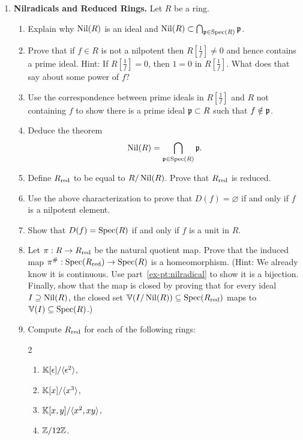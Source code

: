 \documentclass[12pt,reqno]{amsart}
\begin{document}
\begin{enumerate}[leftmargin=*, resume=problems]

\item \textbf{Nilradicals and Reduced Rings.} Let $R$ be a ring. 
\begin{enumerate}
	\item Explain why $\operatorname{Nil}(R)$ is an ideal and $\operatorname{Nil}(R)\subset \bigcap_{\mathfrak{p}\in \operatorname{Spec}(R)}\mathfrak{p}$.
	\item Prove that if $f \in R$ is not a nilpotent then $R[\frac{1}{f}] \neq 0$ and hence contains a prime ideal. Hint: If $R[\frac{1}{f}]=0$, then $1=0$ in $R[\frac{1}{f}]$. What does that say about some power of $f$?
	\item Use the correspondence between prime ideals in $R[\frac{1}{f}]$ and $R$ not containing $f$ to show there is a prime ideal $\mathfrak{p}\subset R$ such that $f\notin \mathfrak{p}$.
	\item\label{ex-pt:nilradical} Deduce the theorem
	\[
	\operatorname{Nil}(R)=\bigcap_{\mathfrak{p}\in \operatorname{Spec}(R)}\mathfrak{p}. 
	\]
	\item Define $R_{\operatorname{red}}$ to be equal to $R/\operatorname{Nil}(R)$. Prove that $R_{\operatorname{red}}$ is reduced.
	\item Use the above characterization to prove that $D(f) = \varnothing$ if and only if $f$ is a nilpotent element. 
	\item Show that $D(f) = \operatorname{Spec}(R)$ if and only if $f$ is a unit in $R$. 
	\item Let $\pi:R \to R_{\operatorname{red}}$ be the natural quotient map. Prove that the induced map $\pi^{\#}:\operatorname{Spec}(R_{\operatorname{red}}) \to \operatorname{Spec}(R)$ is a homeomorphism. (Hint: We already know it is continuous. Use part~\ref{ex-pt:nilradical} to show it is a bijection. Finally, show that the map is closed by proving that for every ideal $I\supseteq \operatorname{Nil}(R)$, the closed set $\mathbb{V}(I/\operatorname{Nil}(R))\subseteq \operatorname{Spec}(R_{\operatorname{red}})$ maps to $\mathbb{V}(I)\subseteq \operatorname{Spec}(R)$.)
	\item Compute $R_{\operatorname{red}}$ for each of the following rings:
	\begin{multicols}{2}
	\begin{enumerate}
		\item $\mathbb{K}[\epsilon]/\langle \epsilon^2\rangle$,
		\item $\mathbb{K}[x]/\langle x^3\rangle$,
		\item $\mathbb{K}[x,y]/\langle x^2,xy\rangle$,
		\item $\mathbb{Z}/12\mathbb{Z}$.
	\end{enumerate}
	\end{multicols}
\end{enumerate}
\end{enumerate}
\end{document}
